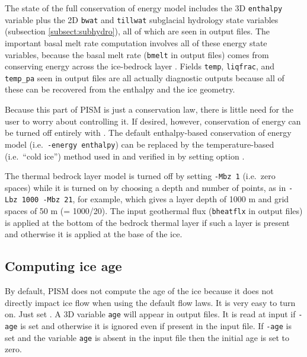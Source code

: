 The state of the full conservation of energy model includes the 3D \texttt{enthalpy} variable plus the 2D \texttt{bwat} and \texttt{tillwat} subglacial hydrology state variables (subsection \ref{subsect:subhydro}), all of which are seen in output files.  The important basal melt rate computation involves all of these energy state variables, because the basal melt rate (\texttt{bmelt} in output files) comes from conserving energy across the ice-bedrock layer \cite{AschwandenBuelerKhroulevBlatter}.  Fields \texttt{temp}, \texttt{liqfrac}, and \texttt{temp_pa} seen in output files are all actually diagnostic outputs because all of these can be recovered from the enthalpy and the ice geometry.

Because this part of PISM is just a conservation law, there is little need for the user to worry about controlling it.  If desired, however, conservation of energy can be turned off entirely with .  The default enthalpy-based conservation of energy model (i.e.~\texttt{-energy enthalpy}) can be replaced by the temperature-based (i.e.~``cold ice'') method used in \cite{BBssasliding} and verified in \cite{BBL} by setting option .

The thermal bedrock layer model is turned off by setting \texttt{-Mbz 1} (i.e.~zero spaces) while it is turned on by choosing a depth and number of points, as in \texttt{-Lbz 1000 -Mbz 21}, for example, which gives a layer depth of 1000 m and grid spaces of 50 m (= 1000/20).  The input geothermal flux (\texttt{bheatflx} in output files) is applied at the bottom of the bedrock thermal layer if such a layer is present and otherwise it is applied at the base of the ice.


\subsection{Computing ice age} \label{subsect:age}

By default, PISM does not compute the age of the ice because it does not directly impact ice flow when using the default flow laws.  It is very easy to turn on.  Just set .  A 3D variable \texttt{age} will appear in output files.  It is read at input if \texttt{-age} is set and otherwise it is ignored even if present in the input file.  If \texttt{-age} is set and the variable \texttt{age} is absent in the input file then the initial age is set to zero.



